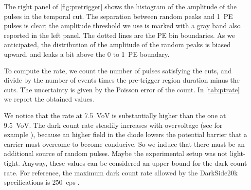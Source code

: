 The right panel of \autoref{fig:pretrigger} shows the histogram of the
amplitude of the pulses in the temporal cut. The separation between random
peaks and 1~PE pulses is clear; the amplitude threshold we use is marked with a
gray band also reported in the left panel. The dotted lines are the PE bin
boundaries. As we anticipated, the distribution of the amplitude of the random
peaks is biased upward, and leaks a bit above the 0 to 1~PE boundary.

To compute the rate, we count the number of pulses satisfying the cuts, and
divide by the number of events times the pre-trigger region duration minus the
cuts. The uncertainty is given by the Poisson error of the count. In
\autoref{tab:ptrate} we report the obtained values.

\begin{table}
    
    
    
\end{table}

We notice that the rate at \SI{7.5}{VoV} is substantially higher than the one
at \SI{9.5}{VoV}. The dark count rate steadily increases with overvoltage (see
for example \cite[fig.~3.13~p.~61]{savarese2018}), because an higher field in
the diode lowers the potential barrier that a carrier must overcome to become
conducive. So we induce that there must be an additional source of random
pulses. Maybe the experimental setup was not light-tight. Anyway, these values
can be considered an upper bound for the dark count rate. For reference, the
maximum dark count rate allowed by the DarkSide20k specifications is
\SI{250}{cps} \cite[tab.~3.1~p.~62]{savarese2018}.

